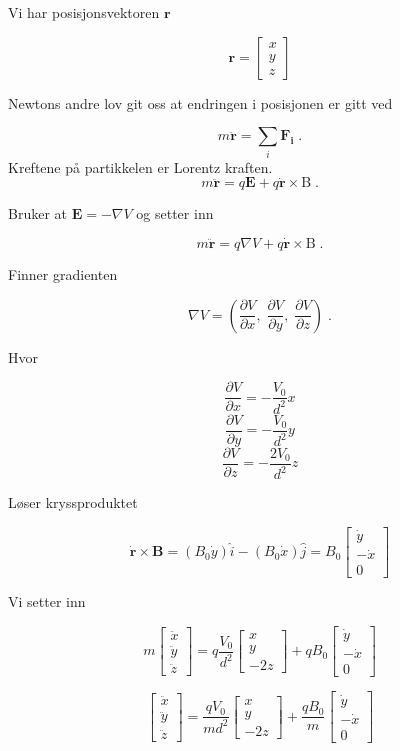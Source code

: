 \documentclass[reprint,english,notitlepage, nofootinbib]{revtex4-1}  %
\begin{document}
Vi har posisjonsvektoren $\mathbf{r}$

$$\mathbf{r} = \begin{bmatrix}
x \\ y \\ z 
\end{bmatrix}$$

Newtons andre lov git oss at endringen i posisjonen er gitt ved

$$m \ddot{\mathbf{r}} = \sum_i \mathbf{F_i} \; .$$
Kreftene på partikkelen er Lorentz kraften.
$$m \ddot{\mathbf{r}} = q \mathbf{E} + q \dot{\mathbf{r}} \times\mathrm{B} \; .$$

Bruker at $\mathbf{E} = -\nabla{V}$ og setter inn

$$m \ddot{\mathbf{r}} = q \nabla{V} + q \dot{\mathbf{r}} \times\mathrm{B} \; .$$

Finner gradienten

$$\nabla{V} = \left ( \frac{\partial V}{\partial x}, \; \frac{\partial V}{\partial y}, \; \frac{\partial V}{\partial z} \right ) \; .$$

Hvor

$$ \frac{\partial V}{\partial x} = -\frac{V_0}{d^2}x$$
$$ \frac{\partial V}{\partial y} = - \frac{V_0}{d^2}y$$
$$ \frac{\partial V}{\partial z} = - \frac{2V_0}{d^2}z$$

Løser kryssproduktet

$$\dot{\mathbf{r}} \times \mathbf{B} = (B_0 \dot{y})\hat{i} - (B_0\dot{x})\hat{j} = B_0 \begin{bmatrix}
\dot{y} \\ -\dot{x} \\ 0
\end{bmatrix}$$

Vi setter inn

$$ m \begin{bmatrix} \ddot{x} \\ \ddot{y} \\ \ddot{z} \end{bmatrix} = q \frac{V_0}{d^2} \begin{bmatrix}
x \\ y \\ -2z 
\end{bmatrix} + q B_0 \begin{bmatrix}
\dot{y} \\ -\dot{x} \\ 0
\end{bmatrix}$$

$$\begin{bmatrix} \ddot{x} \\ \ddot{y} \\ \ddot{z} \end{bmatrix} = \frac{qV_0}{md^2} \begin{bmatrix}
x \\ y \\ -2z 
\end{bmatrix} + \frac{qB_0}{m} \begin{bmatrix}
\dot{y} \\ -\dot{x} \\ 0
\end{bmatrix}$$ 
\end{document}
